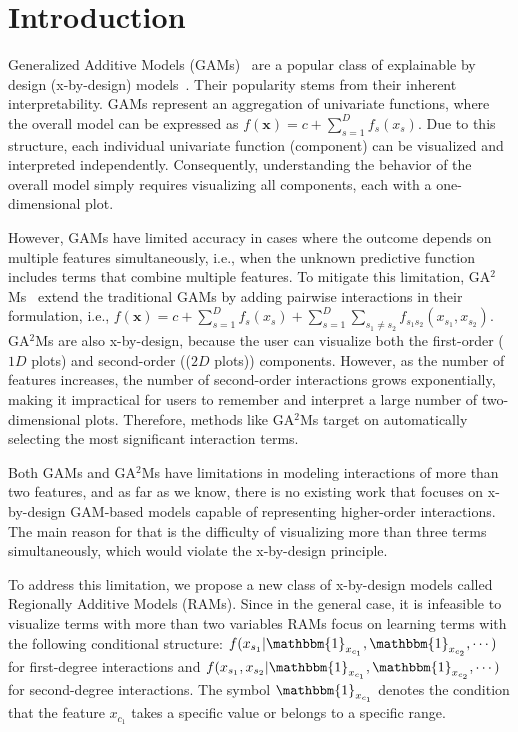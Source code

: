 \documentclass[runningheads]{llncs}
\newcommand{\xb}{\mathbf{x}}
\newcommand{\when}[1]{\mathbbm{1}_{#1}}
\begin{document}
\section{Introduction}
\label{sec:intro}

Generalized Additive Models (GAMs)~\citep{hastie1987generalized} are a popular class of explainable by design
(x-by-design) models~\citep{rudin2019stop, ghassemi2021false}.
Their popularity stems from their inherent interpretability.
GAMs represent an aggregation of univariate functions, where the overall model can be expressed as
\(f(\xb) = c + \sum_{s=1}^D f_s(x_s)\).
Due to this structure, each individual univariate function (component) can be visualized and interpreted independently.
Consequently, understanding the behavior of the overall model simply requires visualizing all components, each with a one-dimensional plot.

However, GAMs have limited accuracy in cases where the outcome depends on multiple features simultaneously,
i.e., when the unknown predictive function includes terms that combine multiple features.
To mitigate this limitation, GA$^2$Ms~\citep{lou2013accurate} extend the traditional GAMs by adding pairwise interactions in their
    formulation, i.e., \(f(\xb) = c + \sum_{s=1}^D f_s(x_s) + \sum_{s=1}^D \sum_{s_1 \neq s_2} f_{s_1 s_2}(x_{s_1}, x_{s_2})\).
GA$^2$Ms are also x-by-design, because the user can visualize both the first-order ($1D$ plots) and
second-order (($2D$ plots)) components.
However, as the number of features increases, the number of second-order interactions grows exponentially,
making it impractical for users to remember and interpret a large number of two-dimensional plots.
Therefore, methods like GA$^2$Ms target on automatically selecting the most significant interaction terms.

Both GAMs and GA$^2$Ms have limitations in modeling interactions of more than two features,
and as far as we know, there is no existing work that focuses on x-by-design GAM-based models capable of
representing higher-order interactions.
The main reason for that is the difficulty of visualizing more than three terms simultaneously,
which would violate the x-by-design principle.

To address this limitation, we propose a new class of x-by-design models called Regionally Additive Models (RAMs).
Since in the general case, it is infeasible to visualize terms with more than two variables
RAMs focus on learning terms with the following conditional structure:
$f(x_{s_1} | \when{x_{c_1}}, \when{x_{c_2}}, \cdots)$ for first-degree interactions and
$f(x_{s_1}, x_{s_2} | \when{x_{c_1}}, \when{x_{c_2}}, \cdots)$ for second-degree interactions.
The symbol $\when{x_{c_1}}$ denotes the condition that the feature $x_{c_1}$ takes a specific value or belongs to a specific range.
\end{document}
